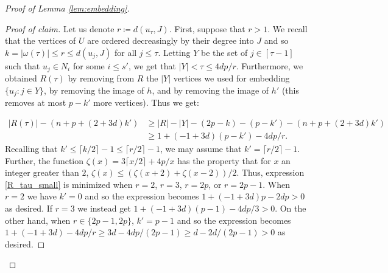\documentclass{article}
\theoremstyle{definition}
\newenvironment{subproof}[1][\proofname]{%
  \renewcommand{\qedsymbol}{$\blacksquare$}%
  \begin{proof}[#1]%
}{%
  \end{proof}%
}
\begin{document}
\begin{proof}[Proof of Lemma \ref{lem:embedding}]
\begin{subproof}[Proof of claim]
Let us denote $r\coloneqq d(u_\tau,J)$. First, suppose that $r>1$. We recall that the vertices of $U$ are ordered decreasingly by their degree into $J$ and so $k=|\omega(\tau)|\leq r\leq d(u_j,J)$ for all $j\leq \tau$. Letting $Y$ be the set of $j\in [\tau-1]$ such that $u_j\in N_i$ for some $i\leq s'$, we get that $|Y|<\tau \leq  4dp/r$. Furthermore, we obtained $R(\tau)$ by removing from $R$ the $|Y|$ vertices we used for embedding $\{u_j:j\in Y\}$, by removing the image of $h$, and by removing the image of $h'$ (this removes at most $p-k'$ more vertices). Thus we get:

\begin{align}
    |R(\tau)|- (n+ p +(2+3d)k')&\geq |R|-|Y|-(2p-k)-(p-k')-(n+p+(2+3d)k')\\&\geq 1+(-1+3d)(p-k')-4dp/r.\label{R_tau_small}  
\end{align} Recalling that $k'\leq \lceil k/2\rceil-1\leq \lceil r/2\rceil-1$, we may assume that $k'= \lceil r/2\rceil-1$. Further, the function $\zeta(x) = 3\lceil x/2\rceil+4p/x$ has the property that for $x$ an integer greater than $2$, $\zeta(x)\leq  (\zeta(x+2)+\zeta(x-2))/2$. Thus, expression \ref{R_tau_small} is minimized when $r=2$, $r=3$, $r=2p$, or $r=2p-1$. When $r= 2$ we have $k'=0$ and so the expression becomes $1+(-1+3d)p-2dp>  0$ as desired. If $r=3$ we instead get $1+(-1+3d)(p-1)-4dp/3>  0$. On the other hand, when $r\in \{2p-1,2p\}$, $k'=p-1$ and so the expression becomes $1+(-1+3d)-4dp/r\geq 3d-4dp/(2p-1)\geq d-2d/(2p-1)> 0$ as desired.


\end{subproof}
\end{proof}
\end{document}

